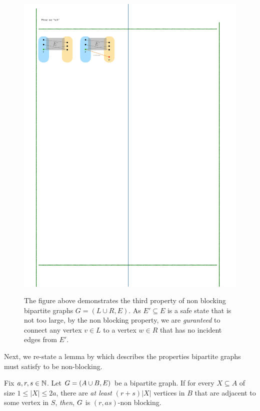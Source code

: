 \documentclass[11pt]{article}
\begin{document}
\begin{figure}[h]
\center
{\caption{The figure above demonstrates the third property of non blocking bipartite graphs $G=(L\cup R, E)$. As $E' \subseteq E$ is a safe state that is not too large, by the non blocking property, we are \emph{guranteed} to connect any vertex $v \in L$ to a vertex $w \in R$ that has no incident edges from $E'$.}
}
\label{fig:test}
{\includegraphics{assets/non-blocking-networks.pdf}}
\end{figure}

Next, we re-state a lemma by \citep[Proposition 1]{feldman1988wide} which describes the properties bipartite graphs must satisfy to be non-blocking.

\begin{lemma}\label{lemma:condtions-for-non-block}
Fix $a, r, s \in \mathbb{N}$. Let $G = (A \cup B, E)$ be a bipartite graph.
If for every $X \subseteq A$ of size $1 \leq |X| \leq 2a$, there are \emph{at least} $(r + s)|X|$ vertices in $B$ that are adjacent to some vertex in $S$, \emph{then}, $G$ is $(r, as)$-non blocking.
\end{lemma}
\end{document}
